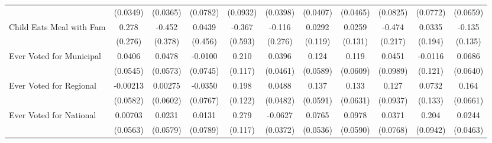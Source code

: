 {\begin{tabular}{l*{10}{c}}
            &    (0.0349)         &    (0.0365)         &    (0.0782)         &    (0.0932)         &    (0.0398)         &    (0.0407)         &    (0.0465)         &    (0.0825)         &    (0.0772)         &    (0.0659)         \\
\addlinespace
Child Eats Meal with Fam&       0.278         &      -0.452         &      0.0439         &      -0.367         &      -0.116         &      0.0292         &      0.0259         &      -0.474\sym{*}  &      0.0335         &      -0.135         \\
            &     (0.276)         &     (0.378)         &     (0.456)         &     (0.593)         &     (0.276)         &     (0.119)         &     (0.131)         &     (0.217)         &     (0.194)         &     (0.135)         \\
\addlinespace
Ever Voted for Municipal&      0.0406         &      0.0478         &     -0.0100         &       0.210         &      0.0396         &       0.124\sym{*}  &       0.119         &      0.0451         &     -0.0116         &      0.0686         \\
            &    (0.0545)         &    (0.0573)         &    (0.0745)         &     (0.117)         &    (0.0461)         &    (0.0589)         &    (0.0609)         &    (0.0989)         &     (0.121)         &    (0.0640)         \\
\addlinespace
Ever Voted for Regional&    -0.00213         &     0.00275         &     -0.0350         &       0.198         &      0.0488         &       0.137\sym{*}  &       0.133\sym{*}  &       0.127         &      0.0732         &       0.164\sym{*}  \\
            &    (0.0582)         &    (0.0602)         &    (0.0767)         &     (0.122)         &    (0.0482)         &    (0.0591)         &    (0.0631)         &    (0.0937)         &     (0.133)         &    (0.0661)         \\
\addlinespace
Ever Voted for National&     0.00703         &      0.0231         &      0.0131         &       0.279\sym{*}  &     -0.0627         &      0.0765         &      0.0978         &      0.0371         &       0.204\sym{*}  &      0.0244         \\
            &    (0.0563)         &    (0.0579)         &    (0.0789)         &     (0.117)         &    (0.0372)         &    (0.0536)         &    (0.0590)         &    (0.0768)         &    (0.0942)         &    (0.0463)         \\
\bottomrule
\end{tabular}
}
